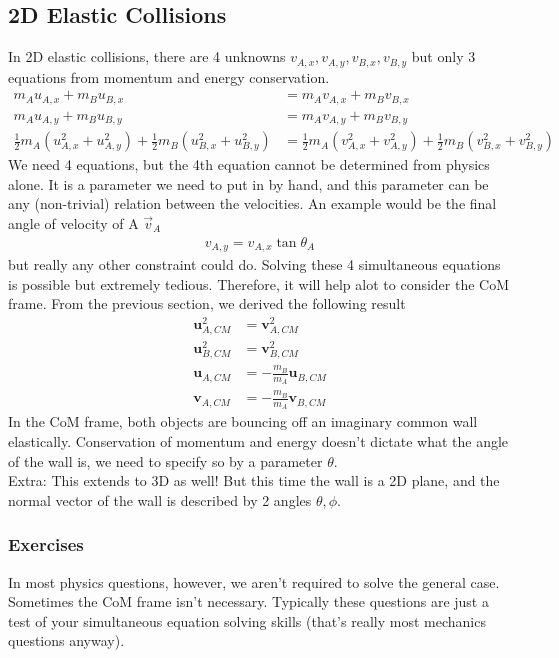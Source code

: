 \documentclass{article}
\begin{document}
\subsection{2D Elastic Collisions}
In 2D elastic collisions, there are 4 unknowns $v_{A,x}, v_{A,y}, v_{B,x}, v_{B,y}$ but only 3 equations from momentum and energy conservation.
\begin{align}
m_A u_{A,x} + m_B u_{B,x} &= m_A v_{A,x} + m_B v_{B,x} \\
m_A u_{A,y} + m_B u_{B,y} &= m_A v_{A,y} + m_B v_{B,y} \\
    \frac{1}{2} m_A (u_{A,x}^2 + u_{A,y}^2) + \frac{1}{2} m_B (u_{B,x}^2 + u_{B,y}^2) 
 &= \frac{1}{2} m_A (v_{A,x}^2 + v_{A,y}^2) + \frac{1}{2} m_B (v_{B,x}^2 + v_{B,y}^2) 
\end{align}
We need 4 equations, but the 4th equation cannot be determined from physics alone. It is a parameter we need to put in by hand, and this parameter can be any (non-trivial) relation between the velocities. An example would be the final angle of velocity of A $\vec{v}_{A}$
\begin{align}
    v_{A,y} = v_{A,x} \tan \theta_A
\end{align}
but really any other constraint could do. Solving these 4 simultaneous equations is possible but extremely tedious. Therefore, it will help alot to consider the CoM frame. From the previous section, we derived the following result
\begin{align}
    \mathbf{u}_{A,CM}^2 &= \mathbf{v}_{A,CM}^2 \\ 
    \mathbf{u}_{B,CM}^2 &= \mathbf{v}_{B,CM}^2 \\ 
    \mathbf{u}_{A,CM} &= -\frac{m_B}{m_A} \mathbf{u}_{B,CM}\\
    \mathbf{v}_{A,CM} &= -\frac{m_B}{m_A} \mathbf{v}_{B,CM}
\end{align}
In the CoM frame, both objects are bouncing off an imaginary common wall elastically. Conservation of momentum and energy doesn't dictate what the angle of the wall is, we need to specify so by a parameter $\theta$. \\[10pt]
Extra: This extends to 3D as well! But this time the wall is a 2D plane, and the normal vector of the wall is described by 2 angles $\theta,\phi$.\\[10pt]
\subsubsection{Exercises}
In most physics questions, however, we aren't required to solve the general case. Sometimes the CoM frame isn't necessary. Typically these questions are just a test of your simultaneous equation solving skills (that's really most mechanics questions anyway).
\end{document}
